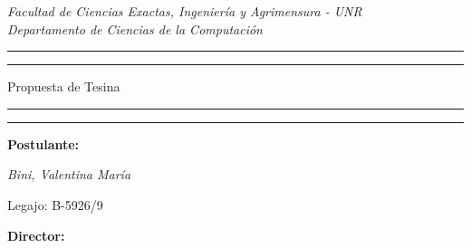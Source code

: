 \documentclass[11pt,a4paper]{article}
\date{}
\begin{document}
\begin{titlepage}  %

	\centering %
	\scshape %
	
	\textit{Facultad de Ciencias Exactas, Ingeniería y Agrimensura - UNR\\Departamento de Ciencias de la Computación }
	
	\vspace{\baselineskip}
	
	
	\rule{\textwidth}{1.6pt}\vspace*{-\baselineskip}\vspace*{2pt} %
	\rule{\textwidth}{0.4pt} %
	
	\vspace{0.75\baselineskip} %
	
	{\huge Propuesta de Tesina\\} %
	
	\vspace{0.75\baselineskip} %
	
	\rule{\textwidth}{0.4pt}\vspace*{-\baselineskip}\vspace{3.2pt} %
	\rule{\textwidth}{1.6pt} %
	
	\vspace{\baselineskip} %
	
	
	\Large{\textbf{Postulante:}}
	
	\vspace{\baselineskip} %
	
    {\itshape\LARGE Bini, Valentina María}
	
	\vspace{0.5\baselineskip} %
	
	\large{Legajo: B-5926/9}
	
	\vspace{2\baselineskip} %

        \Large{\textbf{Director:}}
	
	\vspace{\baselineskip} %
	

\end{titlepage}
\end{document}
